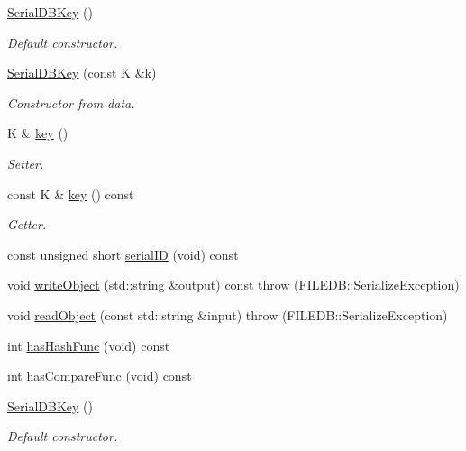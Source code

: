 \begin{DoxyCompactItemize}
\item 
\mbox{\hyperlink{classADATIO_1_1SerialDBKey_acaf28250dcc8a2b3944f7edef046df05}{Serial\+D\+B\+Key}} ()
\begin{DoxyCompactList}\small\item\em Default constructor. \end{DoxyCompactList}\item 
\mbox{\hyperlink{classADATIO_1_1SerialDBKey_ad035f1ac5d8565aec4e5a7197333123f}{Serial\+D\+B\+Key}} (const K \&k)
\begin{DoxyCompactList}\small\item\em Constructor from data. \end{DoxyCompactList}\item 
K \& \mbox{\hyperlink{classADATIO_1_1SerialDBKey_a9dc566bd8bc83d98d4438d220012648a}{key}} ()
\begin{DoxyCompactList}\small\item\em Setter. \end{DoxyCompactList}\item 
const K \& \mbox{\hyperlink{classADATIO_1_1SerialDBKey_a89514c7decfe6ee0573032faff49703a}{key}} () const
\begin{DoxyCompactList}\small\item\em Getter. \end{DoxyCompactList}\item 
const unsigned short \mbox{\hyperlink{classADATIO_1_1SerialDBKey_a0d088e08f453fd38a906208783f788d7}{serial\+ID}} (void) const
\item 
void \mbox{\hyperlink{classADATIO_1_1SerialDBKey_a6e2d9bbd18a3fa5e049f0ad5321d328a}{write\+Object}} (std\+::string \&output) const  throw (\+F\+I\+L\+E\+D\+B\+::\+Serialize\+Exception)
\item 
void \mbox{\hyperlink{classADATIO_1_1SerialDBKey_a10b5c24f2529bac1df4c4603c2caf551}{read\+Object}} (const std\+::string \&input)  throw (\+F\+I\+L\+E\+D\+B\+::\+Serialize\+Exception)
\item 
int \mbox{\hyperlink{classADATIO_1_1SerialDBKey_ae8926cd9bdef006f3729f4b724a2e2fe}{has\+Hash\+Func}} (void) const
\item 
int \mbox{\hyperlink{classADATIO_1_1SerialDBKey_a2f28d2ac39919d9cb9f6fc097944c49c}{has\+Compare\+Func}} (void) const
\item 
\mbox{\hyperlink{classADATIO_1_1SerialDBKey_acaf28250dcc8a2b3944f7edef046df05}{Serial\+D\+B\+Key}} ()
\begin{DoxyCompactList}\small\item\em Default constructor. \end{DoxyCompactList}\item 

\end{DoxyCompactItemize}
